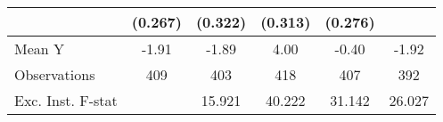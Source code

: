 {\begin{tabular}{l*{5}{c}}
            &     (0.267)         &     (0.322)         &     (0.313)         &     (0.276)         &                     \\
\midrule
Mean Y      &       -1.91         &       -1.89         &        4.00         &       -0.40         &       -1.92         \\
Observations&         409         &         403         &         418         &         407         &         392         \\
Exc. Inst. F-stat&                     &      15.921         &      40.222         &      31.142         &      26.027         \\
\bottomrule
\end{tabular}
}
